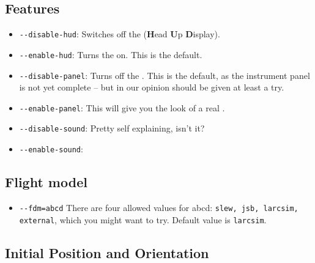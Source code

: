 \subsection{Features}

\begin{itemize}

\item{\texttt{-$\!$-disable-hud}}: Switches off the  (\textbf{H}ead \textbf{U}p
  \textbf{D}isplay).

\item{\texttt{-$\!$-enable-hud}}: Turns the   on. This is the default.

\item{\texttt{-$\!$-disable-panel}}: Turns off the . This is the
  default, as the instrument panel is not yet complete -- but in our opinion
  should be given at least a try.

\item{\texttt{-$\!$-enable-panel}}: This will give you the look of a real .

\item{\texttt{-$\!$-disable-sound}}: Pretty self explaining, isn't it?

\item{\texttt{-$\!$-enable-sound}}:

\end{itemize}


\subsection{Flight model}

\begin{itemize}

\item{\texttt{-$\!$-fdm=abcd}} There are four allowed values for abcd: \texttt{slew, jsb, larcsim,
external}, which you might want to try. Default value is \texttt{larcsim}.

\end{itemize}

\subsection{Initial Position and Orientation}


